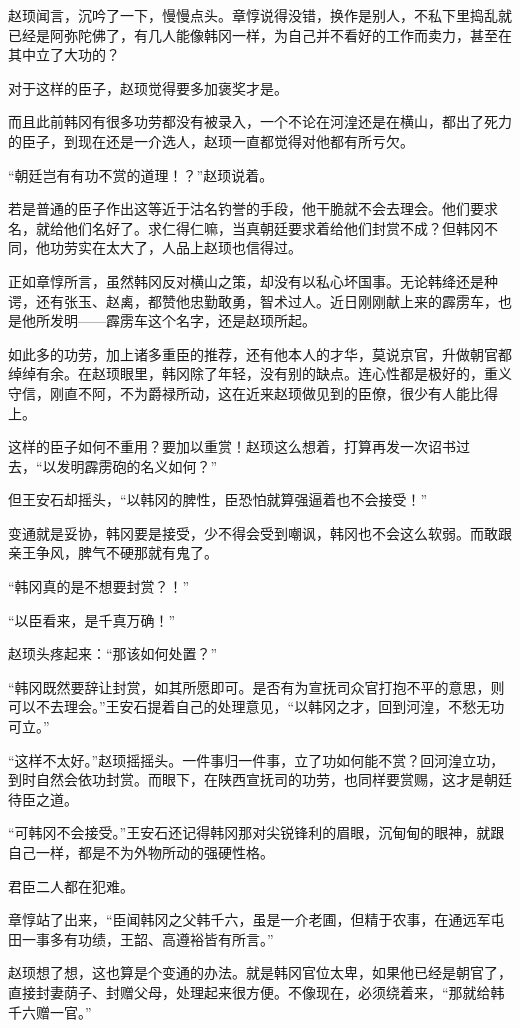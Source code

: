 赵顼闻言，沉吟了一下，慢慢点头。章惇说得没错，换作是别人，不私下里捣乱就已经是阿弥陀佛了，有几人能像韩冈一样，为自己并不看好的工作而卖力，甚至在其中立了大功的？

对于这样的臣子，赵顼觉得要多加褒奖才是。

而且此前韩冈有很多功劳都没有被录入，一个不论在河湟还是在横山，都出了死力的臣子，到现在还是一介选人，赵顼一直都觉得对他都有所亏欠。

“朝廷岂有有功不赏的道理！？”赵顼说着。

若是普通的臣子作出这等近于沽名钓誉的手段，他干脆就不会去理会。他们要求名，就给他们名好了。求仁得仁嘛，当真朝廷要求着给他们封赏不成？但韩冈不同，他功劳实在太大了，人品上赵顼也信得过。

正如章惇所言，虽然韩冈反对横山之策，却没有以私心坏国事。无论韩绛还是种谔，还有张玉、赵禼，都赞他忠勤敢勇，智术过人。近日刚刚献上来的霹雳车，也是他所发明——霹雳车这个名字，还是赵顼所起。

如此多的功劳，加上诸多重臣的推荐，还有他本人的才华，莫说京官，升做朝官都绰绰有余。在赵顼眼里，韩冈除了年轻，没有别的缺点。连心性都是极好的，重义守信，刚直不阿，不为爵禄所动，这在近来赵顼做见到的臣僚，很少有人能比得上。

这样的臣子如何不重用？要加以重赏！赵顼这么想着，打算再发一次诏书过去，“以发明霹雳砲的名义如何？”

但王安石却摇头，“以韩冈的脾性，臣恐怕就算强逼着也不会接受！”

变通就是妥协，韩冈要是接受，少不得会受到嘲讽，韩冈也不会这么软弱。而敢跟亲王争风，脾气不硬那就有鬼了。

“韩冈真的是不想要封赏？！”

“以臣看来，是千真万确！”

赵顼头疼起来：“那该如何处置？”

“韩冈既然要辞让封赏，如其所愿即可。是否有为宣抚司众官打抱不平的意思，则可以不去理会。”王安石提着自己的处理意见，“以韩冈之才，回到河湟，不愁无功可立。”

“这样不太好。”赵顼摇摇头。一件事归一件事，立了功如何能不赏？回河湟立功，到时自然会依功封赏。而眼下，在陕西宣抚司的功劳，也同样要赏赐，这才是朝廷待臣之道。

“可韩冈不会接受。”王安石还记得韩冈那对尖锐锋利的眉眼，沉甸甸的眼神，就跟自己一样，都是不为外物所动的强硬性格。

君臣二人都在犯难。

章惇站了出来，“臣闻韩冈之父韩千六，虽是一介老圃，但精于农事，在通远军屯田一事多有功绩，王韶、高遵裕皆有所言。”

赵顼想了想，这也算是个变通的办法。就是韩冈官位太卑，如果他已经是朝官了，直接封妻荫子、封赠父母，处理起来很方便。不像现在，必须绕着来，“那就给韩千六赠一官。”

